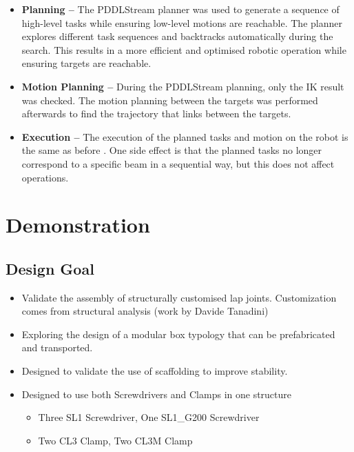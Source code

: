 \begin{itemize}
	\item \textbf{Planning --} The PDDLStream planner was used to generate a sequence of high-level tasks while ensuring low-level motions are reachable. The planner explores different task sequences and backtracks automatically during the search. This results in a more efficient and optimised robotic operation while ensuring targets are reachable.

	\item \textbf{Motion Planning --} During the PDDLStream planning, only the IK result was checked. The motion planning between the targets was performed afterwards to find the trajectory that links between the targets.

	\item \textbf{Execution --} The execution of the planned tasks and motion on the robot is the same as before . One side effect is that the planned tasks no longer correspond to a specific beam in a sequential way, but this does not affect operations.

\end{itemize}
\section{Demonstration}
\label{section:exploration_5_demonstration}

\subsection{Design Goal}
\label{subsection:exploration_5_design_goal}

\begin{itemize}
	\item Validate the assembly of structurally customised lap joints. Customization comes from structural analysis (work by Davide Tanadini)

	\item Exploring the design of a modular box typology that can be prefabricated and transported.

	\item Designed to validate the use of scaffolding to improve stability.

	\item Designed to use both Screwdrivers and Clamps in one structure

\begin{itemize}
	\item Three SL1 Screwdriver, One SL1\_G200 Screwdriver

	\item Two CL3 Clamp, Two CL3M Clamp

\end{itemize}
\end{itemize}
